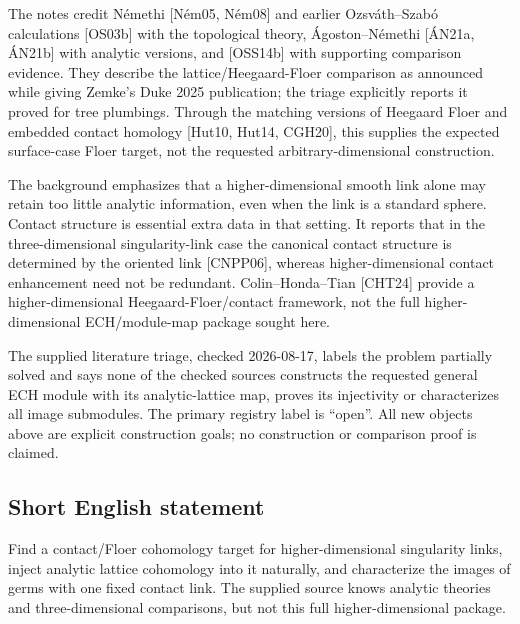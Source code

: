 \documentclass[11pt]{article}
\begin{document}
The notes credit Némethi [Ném05, Ném08] and earlier Ozsváth--Szabó calculations [OS03b] with the topological theory, Ágoston--Némethi [ÁN21a, ÁN21b] with analytic versions, and [OSS14b] with supporting comparison evidence. They describe the lattice/Heegaard-Floer comparison as announced while giving Zemke's Duke 2025 publication; the triage explicitly reports it proved for tree plumbings. Through the matching versions of Heegaard Floer and embedded contact homology [Hut10, Hut14, CGH20], this supplies the expected surface-case Floer target, not the requested arbitrary-dimensional construction.

The background emphasizes that a higher-dimensional smooth link alone may retain too little analytic information, even when the link is a standard sphere. Contact structure is essential extra data in that setting. It reports that in the three-dimensional singularity-link case the canonical contact structure is determined by the oriented link [CNPP06], whereas higher-dimensional contact enhancement need not be redundant. Colin--Honda--Tian [CHT24] provide a higher-dimensional Heegaard-Floer/contact framework, not the full higher-dimensional ECH/module-map package sought here.

The supplied literature triage, checked 2026-08-17, labels the problem partially solved and says none of the checked sources constructs the requested general ECH module with its analytic-lattice map, proves its injectivity or characterizes all image submodules. The primary registry label is ``open''. All new objects above are explicit construction goals; no construction or comparison proof is claimed.
\subsection{Short English statement}
Find a contact/Floer cohomology target for higher-dimensional singularity links, inject analytic lattice cohomology into it naturally, and characterize the images of germs with one fixed contact link. The supplied source knows analytic theories and three-dimensional comparisons, but not this full higher-dimensional package.
\end{document}

